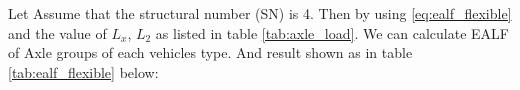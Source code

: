 Let Assume that the structural number (SN) is 4. Then by using \ref{eq:ealf_flexible}
and the value of $L_x$, $L_2$ as listed in table \ref{tab:axle_load}. We can calculate
EALF of Axle groups of each vehicles type. And result shown as in table \ref{tab:ealf_flexible} below:

\begin{table}[H]
\centering
{}
\end{table}
